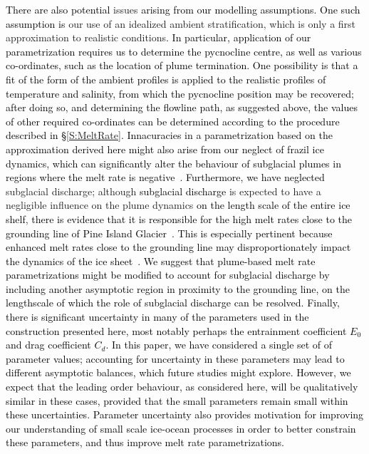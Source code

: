 \documentclass[openacc]{rsproca_new}%
\newcommand{\red}[1]{{\color{red} #1}}
\newcommand{\blue}[1]{{\color{blue} #1}}
\newcommand{\rout}[1]{\red{\st{#1}}}\newcommand{\ab}[1]{\textcolor{Green}{#1}}\newcommand{\about}[1]{\textcolor{Cyan}{\sout{#1}}}
\renewcommand{\rout}[1]{{}} %
\renewcommand{\blue}[1]{{\textcolor{black}{#1}}} %
\renewcommand{\red}[1]{{}} %
\begin{document}
\rout{Other possible pragmatic} \blue{There are also potential} issues \blue{arising from our modelling assumptions. One such assumption is}\rout{include} our use of an idealized ambient stratification, which is only a first approximation to realistic conditions\blue{. In particular, application of our parametrization requires us to determine the pycnocline centre, as well as various co-ordinates, such as the location of plume termination. One possibility is that a fit of the form of the ambient profiles is applied to the realistic profiles of temperature and salinity, from which the pycnocline position may be recovered; after doing so, and determining the flowline path, as suggested above, the values of other required co-ordinates can be determined according to the procedure described in \S\ref{S:MeltRate}.} \rout{, and} \blue{Innacuracies in a parametrization based on the approximation derived here might also arise from our neglect of frazil ice dynamics, which can significantly alter the behaviour of subglacial plumes in regions where the melt rate is negative~\cite{ReesJones2018Cryo}. Furthermore, }\rout{our neglect of}\blue{we have neglected} subglacial discharge; although \rout{the latter}\blue{subglacial discharge} is expected to have a negligible influence on the plume dynamics \blue{on the length scale of the entire ice shelf}, \blue{there is evidence that it is responsible for the high melt rates close to the grounding line of Pine Island Glacier~\cite{Nakayama2021GRL}. } \rout{it may permit a high melt rate near to the grounding line, which has been shown to have a significant influence on the dynamics of the entire ice sheet}\blue{This is especially pertinent because enhanced melt rates close to the grounding line may disproportionately impact the dynamics of the ice sheet~\cite{Arthern2017GRL,Seroussi2018Cryo}. We suggest that plume-based melt rate parametrizations might be modified to account for subglacial discharge by including another asymptotic region in proximity to the grounding line, on the lengthscale of which the role of subglacial discharge can be resolved.} \blue{Finally, there is significant uncertainty in many of the parameters used in the construction presented here, most notably perhaps the entrainment coefficient $E_0$ and drag coefficient $C_d$. In this paper, we have considered a single set of of parameter values; accounting for uncertainty in these parameters may lead to different asymptotic balances, which future studies might explore. However, we expect that the leading order behaviour, as considered here, will be qualitatively similar in these cases, provided that the small parameters remain small within these uncertainties. Parameter uncertainty also provides motivation for improving our understanding of small scale ice-ocean processes in order to better constrain these parameters, and thus improve melt rate parametrizations.}
\end{document}
